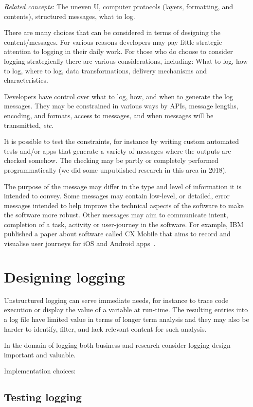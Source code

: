 \emph{Related concepts}: The uneven U, computer protocols (layers, formatting, and contents), structured messages, what to log. %

There are many choices that can be considered in terms of designing the content/messages. For various reasons developers may pay little strategic attention to logging in their daily work. For those who do choose to consider logging strategically there are various considerations, including:
What to log, how to log, where to log, data transformations, delivery mechanisms and characteristics.

Developers have control over what to log, how, and when to generate the log messages. They may be constrained in various ways by APIs, message lengths, encoding, and formats, access to messages, and when messages will be transmitted, \emph{etc.} 

It is possible to test the constraints, for instance by writing custom automated tests and/or apps that generate a variety of messages where the outputs are checked somehow. The checking may be partly or completely performed programmatically (we did some unpublished research in this area in 2018).

The purpose of the message may differ in the type and level of information it is intended to convey. Some messages may contain low-level, or detailed, error messages intended to help improve the technical aspects of the software to make the software more robust. Other messages may aim to communicate intent, completion of a task, activity or user-journey in the software. For example, IBM published a paper about software called CX Mobile that aims to record and visualise user journeys for iOS and Android apps~\cite{hu_tealeaf_cxmobile}.

\section{Designing logging}
Unstructured logging can serve immediate needs, for instance to trace code execution or display the value of a variable at run-time. The resulting entries into a log file have limited value in terms of longer term analysis and they may also be harder to identify, filter, and lack relevant content for such analysis.

In the domain of logging both business and research consider logging design important and valuable. 

Implementation choices: 

\subsection{Testing logging}



